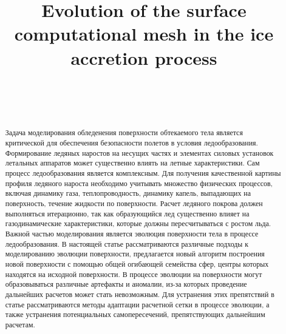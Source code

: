 \documentclass[
11pt,%
tightenlines,%
twoside,%
onecolumn,%
nofloats,%
nobibnotes,%
nofootinbib,%
superscriptaddress,%
noshowpacs,%
centertags]%
{revtex4}
\begin{document}

\title{Evolution of the surface computational mesh in the ice accretion process}

\author{~}

\author{~}



\begin{abstract}
Задача моделирования обледенения поверхности обтекаемого тела является критической для обеспечения безопасности полетов в условия ледообразования.
Формирование ледяных наростов на несущих частях и элементах силовых установок летальных аппаратов может существенно влиять на летные характеристики.
Сам процесс ледообразования является комплексным.
Для получения качественной картины профиля ледяного нароста необходимо учитывать множество физических процессов, включая динамику газа, теплопроводность, динамику капель, выпадающих на поверхность, течение жидкости по поверхности.
Расчет ледяного покрова должен выполняться итерационно, так как образующийся лед существенно влияет на газодинамические характеристики, которые должны пересчитываться с ростом льда.
Важной частью моделирования является эволюция поверхности тела в процессе ледообразования.
В настоящей статье рассматриваются различные подходы к моделированию эволюции поверхности, предлагается новый алгоритм построения новой поверхности с помощью общей огибающей семейства сфер, центры которых находятся на исходной поверхности.
В процессе эволюции на поверхности могут образовываться различные артефакты и аномалии, из-за которых проведение дальнейших расчетов может стать невозможным.
Для устранения этих препятствий в статье рассматриваются методы адаптации расчетной сетки в процессе эволюции, а также устранения потенциальных самопересечений, препятствующих дальнейшим расчетам.
\end{abstract}
\end{document}
